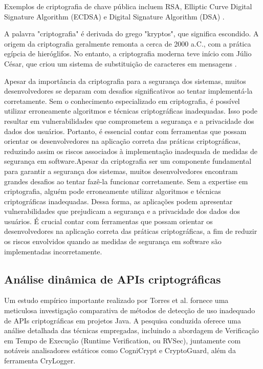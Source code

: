Exemplos de criptografia de chave pública incluem RSA, Elliptic Curve Digital Signature Algorithm (ECDSA) e Digital Signature Algorithm (DSA) \cite{what_is_cryptography}.

A palavra "criptografia" é derivada do grego "kryptos", que significa escondido. A origem da criptografia geralmente remonta a cerca de 2000 a.C., com a prática egípcia de hieróglifos. No entanto, a criptografia moderna teve início com Júlio César, que criou um sistema de substituição de caracteres em mensagens \cite{what_is_cryptography}.

Apesar da importância da criptografia para a segurança dos sistemas, muitos desenvolvedores se deparam com desafios significativos ao tentar implementá-la corretamente. Sem o conhecimento especializado em criptografia, é possível utilizar erroneamente algoritmos e técnicas criptográficas inadequadas. Isso pode resultar em vulnerabilidades que comprometem a segurança e a privacidade dos dados dos usuários. Portanto, é essencial contar com ferramentas que possam orientar os desenvolvedores na aplicação correta das práticas criptográficas, reduzindo assim os riscos associados à implementação inadequada de medidas de segurança em software.Apesar da criptografia ser um componente fundamental para garantir a segurança dos sistemas, muitos desenvolvedores encontram grandes desafios ao tentar fazê-la funcionar corretamente. Sem a expertise em criptografia, alguém pode erroneamente utilizar algoritmos e técnicas criptográficas inadequadas. Dessa forma, as aplicações podem apresentar vulnerabilidades que prejudicam a segurança e a privacidade dos dados dos usuários. É crucial contar com ferramentas que possam orientar os desenvolvedores na aplicação correta das práticas criptográficas, a fim de reduzir os riscos envolvidos quando as medidas de segurança em software são implementadas incorretamente.\cite{api_misuses_zhang}

\subsection{Análise dinâmica de APIs criptográficas} %
Um estudo empírico importante realizado por Torres et al. \cite{runtime_verification_crypto} fornece uma meticulosa investigação comparativa de métodos de detecção de uso inadequado de APIs criptográficas em projetos Java. A pesquisa conduzida oferece uma análise detalhada das técnicas empregadas, incluindo a abordagem de Verificação em Tempo de Execução (Runtime Verification, ou RVSec), juntamente com notáveis analisadores estáticos como CogniCrypt e CryptoGuard, além da ferramenta CryLogger.

